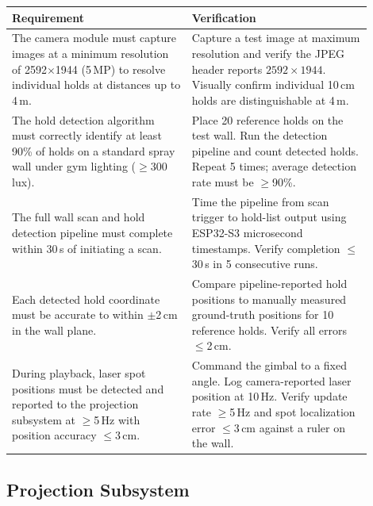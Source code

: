 \documentclass[12pt]{extarticle}
\begin{document}
\begin{longtable}{>{\raggedright\arraybackslash}p{0.45\linewidth}
                  >{\raggedright\arraybackslash}p{0.45\linewidth}}
\toprule
\textbf{Requirement} & \textbf{Verification} \\
\midrule
\endhead
\bottomrule
\endfoot

The camera module must capture images at a minimum resolution of 2592$\times$1944 (5\,MP) to
resolve individual holds at distances up to 4\,m. &
Capture a test image at maximum resolution and verify the JPEG header reports
$2592\times1944$. Visually confirm individual 10\,cm holds are distinguishable at 4\,m. \\
\addlinespace

The hold detection algorithm must correctly identify at least 90\% of holds on a standard
spray wall under gym lighting ($\geq$300\,lux). &
Place 20 reference holds on the test wall. Run the detection pipeline and count detected holds.
Repeat 5 times; average detection rate must be $\geq$90\%. \\
\addlinespace

The full wall scan and hold detection pipeline must complete within 30\,s of initiating a
scan. &
Time the pipeline from scan trigger to hold-list output using ESP32-S3 microsecond timestamps.
Verify completion $\leq$30\,s in 5 consecutive runs. \\
\addlinespace

Each detected hold coordinate must be accurate to within $\pm$2\,cm in the wall plane. &
Compare pipeline-reported hold positions to manually measured ground-truth positions for 10
reference holds. Verify all errors $\leq$2\,cm. \\
\addlinespace

During playback, laser spot positions must be detected and reported to the projection subsystem
at $\geq$5\,Hz with position accuracy $\leq$3\,cm. &
Command the gimbal to a fixed angle. Log camera-reported laser position at 10\,Hz. Verify
update rate $\geq$5\,Hz and spot localization error $\leq$3\,cm against a ruler on the wall. \\
\end{longtable}

\subsection{Projection Subsystem}
\label{sec:projection}
\end{document}
